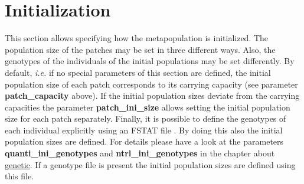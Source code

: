 \documentclass[letterpaper,12pt,oneside]{book}
\begin{document}
\section{Initialization}
This section allows specifying how the metapopulation is initialized. The population size of the patches may be set in three different ways. Also, the genotypes of the individuals of the initial populations may be set differently. By default, \textit{i.e.} if no special parameters of this section are defined, the initial population size of each patch corresponds to its carrying capacity (see parameter \textbf{patch\_capacity} above). If the initial population sizes deviate from the carrying capacities the parameter \textbf{patch\_ini\_size} allows setting the initial population size for each patch separately. Finally, it is possible to define the genotypes of each individual explicitly using an FSTAT file \citep{Goudet_1995}. By doing this also the initial population sizes are defined. For details please have a look at the parameters \textbf{quanti\_ini\_genotypes} and \textbf{ntrl\_ini\_genotypes} in the chapter about \hyperref[chap:Genetics]{genetic}. If a genotype file is present the initial population sizes are defined using this file.
\end{document}
